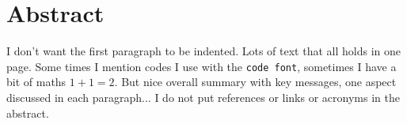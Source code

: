 \chapter{Abstract}

\sloppy I don't want the first paragraph to be indented. Lots of text that all holds in one page. Some times I mention codes I use with the \texttt{code font}, sometimes I have a bit of maths $1+1=2$. But nice overall summary with key messages, one aspect discussed in each paragraph... I do not put references or links or acronyms in the abstract.